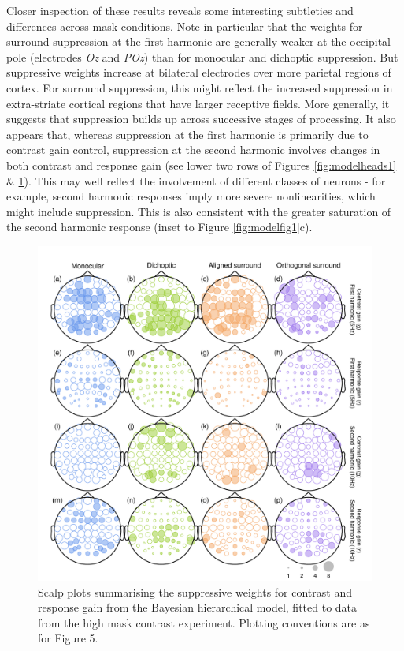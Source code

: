 \documentclass[]{article}
\begin{document}
Closer inspection of these results reveals some interesting subtleties and differences across mask conditions. Note in particular that the weights for surround suppression at the first harmonic are generally weaker at the occipital pole (electrodes \emph{Oz} and \emph{POz}) than for monocular and dichoptic suppression. But suppressive weights increase at bilateral electrodes over more parietal regions of cortex. For surround suppression, this might reflect the increased suppression in extra-striate cortical regions that have larger receptive fields. More generally, it suggests that suppression builds up across successive stages of processing. It also appears that, whereas suppression at the first harmonic is primarily due to contrast gain control, suppression at the second harmonic involves changes in both contrast and response gain (see lower two rows of Figures \ref{fig:modelheads1} \& \ref{fig:modelheads2}). This may well reflect the involvement of different classes of neurons - for example, second harmonic responses imply more severe nonlinearities, which might include suppression. This is also consistent with the greater saturation of the second harmonic response (inset to Figure \ref{fig:modelfig1}c).

\begin{figure}

{\centering \includegraphics{figures/modelheads2} 

}

\caption{Scalp plots summarising the suppressive weights for contrast and response gain from the Bayesian hierarchical model, fitted to data from the high mask contrast experiment. Plotting conventions are as for Figure 5.}\label{fig:modelheads2}
\end{figure}
\end{document}
